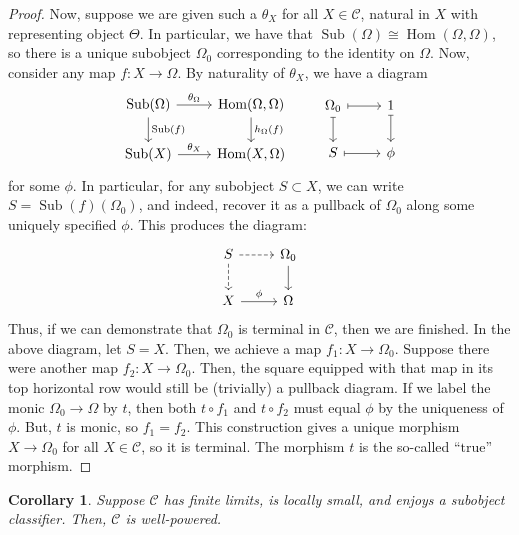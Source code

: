 \documentclass{amsart}
\DeclareMathOperator{\Sub}{Sub}
\DeclareMathOperator{\Hom}{Hom}
\newtheorem{corollary}[theorem]{Corollary}
\theoremstyle{definition}
\theoremstyle{remark}
\begin{document}
\begin{proof}
    Now, suppose we are given such a $\theta_X$ for all $X \in \mathcal{C}$,
    natural in $X$ with representing object $\Theta$. In particular, we have
    that $\Sub(\Omega) \cong \Hom(\Omega, \Omega)$, so there is a unique
    subobject $\Omega_0$ corresponding to the identity on $\Omega$. Now,
    consider any map $f : X \to \Omega$. By naturality of $\theta_X$, we have a
    diagram
    \[
        \begin{tikzcd}
            \Sub(\Omega) \ar[r, "\theta_\Omega"] \ar[d, "\Sub(f)"] &
            \Hom(\Omega, \Omega) \ar[d, "h_\Omega(f)"] \\
            \Sub(X) \ar[r, "\theta_X"] &
            \Hom(X, \Omega)
        \end{tikzcd}
        \quad\quad
        \begin{tikzcd}
            \Omega_0 \ar[d, mapsto] \ar[r, mapsto] & 1 \ar[d, mapsto] \\
            S \ar[r, mapsto] & \phi
        \end{tikzcd}
    \]
    for some $\phi$. In particular, for any subobject $S \subset X$, we can
    write $S = \Sub(f)(\Omega_0)$, and indeed, recover it as a pullback of
    $\Omega_0$ along some uniquely specified $\phi$. This produces the diagram:
    \[
        \begin{tikzcd}
            S \ar[r, dashed] \ar[d, dashed] & \Omega_0 \ar[d] \\
            X \ar[r, "\phi"] & \Omega
        \end{tikzcd}
    \]
    Thus, if we can demonstrate that $\Omega_0$ is terminal in $\mathcal{C}$,
    then we are finished. In the above diagram, let $S = X$. Then, we achieve a
    map $f_1 : X \to \Omega_0$. Suppose there were another map $f_2 : X \to
    \Omega_0$. Then, the square equipped with that map in its top horizontal row
    would still be (trivially) a pullback diagram. If we label the monic
    $\Omega_0 \to \Omega$ by $t$, then both $t \circ f_1$ and $t \circ f_2$ must
    equal $\phi$ by the uniqueness of $\phi$. But, $t$ is monic, so $f_1 = f_2$.
    This construction gives a unique morphism $X \to \Omega_0$ for all $X \in
    \mathcal{C}$, so it is terminal. The morphism $t$ is the so-called
    ``$\text{true}$'' morphism.
\end{proof}

\begin{corollary}
    Suppose $\mathcal{C}$ has finite limits, is locally small, and enjoys a
    subobject classifier. Then, $\mathcal{C}$ is well-powered.
\end{corollary}





\end{document}
